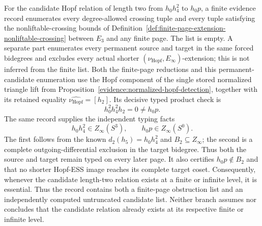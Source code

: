 \begin{proposition}
  \label{evidence:hopf-crossing-obstruction-exclusion}
  \notready
  For the candidate Hopf relation of length two from
  $h_0h_4^2$ to $h_0p$, a finite evidence record enumerates every
  degree-allowed crossing tuple and every tuple satisfying the
  nonliftable-crossing bounds of
  Definition~\ref{def:finite-page-extension-nonliftable-crossing} between
  $E_3$ and any finite page.  The list is
  empty.  A separate part enumerates every permanent source and target in the
  same forced bidegrees and excludes every actual shorter
  $(\nu_{\mathrm{Hopf}},E_\infty)$-extension; this is not inferred from the
  finite list.  Both the finite-page reductions and this permanent-candidate
  enumeration use the Hopf component of the single stored normalized
  triangle lift from Proposition~\ref{evidence:normalized-hopf-detection},
  together with its retained equality
  $\widehat{\nu_{\mathrm{Hopf}}}=[h_2]$.  Its decisive typed product check is
  \[
    h_0^2h_4^2h_2=0\ne h_0p.
  \]
  The same record supplies the independent typing facts
  \[
    h_0h_4^2\in Z_\infty(S^3),
    \qquad h_0p\in Z_\infty(S^0).
  \]
  The first follows from the known $d_2(h_5)=h_0h_4^2$ and
  $B_2\subseteq Z_\infty$; the second is a complete outgoing-differential
  exclusion in the target bidegree.  Thus both the source and target remain
  typed on every later page.  It also certifies
  $h_0p\notin B_2$ and that no shorter Hopf-ESS image reaches its complete
  target coset.  Consequently, whenever the candidate length-two relation
  exists at a finite or infinite level, it is essential.
  Thus the record contains both a finite-page obstruction list and an
  independently computed untruncated candidate list.  Neither branch assumes
  nor concludes that the candidate relation already exists at its respective
  finite or infinite level.
\end{proposition}

